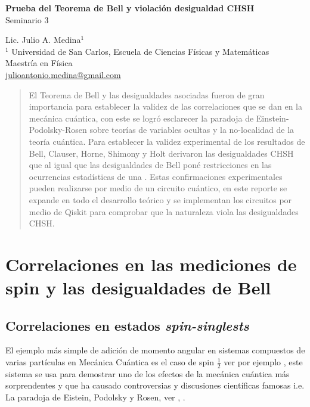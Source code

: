 \documentclass[a4paper]{article}
\begin{document}

\Large
 \begin{center}
\textbf{Prueba del Teorema de Bell y violación desigualdad CHSH}\\
Seminario 3  

\hspace{10pt}

\large
Lic. Julio A. Medina$^1$ \\

\hspace{10pt}
\small  
$^1$ Universidad de San Carlos, Escuela de Ciencias Físicas y Matemáticas\\
Maestría en Física\\
\href{mailto:julioantonio.medina@gmail.com}{julioantonio.medina@gmail.com}\\

\end{center}

\hspace{10pt}


\normalsize

\begin{abstract}
El Teorema de Bell y las desigualdades asociadas fueron de gran importancia para establecer la validez de las correlaciones que se dan en la mecánica cuántica, con este se logró esclarecer la paradoja de Einstein-Podolsky-Rosen sobre teorías de variables ocultas y la no-localidad de la teoría cuántica. Para establecer la validez experimental de los resultados de Bell, Clauser, Horne, Shimony y Holt derivaron las desigualdades CHSH que al igual que las desigualdades de Bell poné restricciones en las ocurrencias estadísticas de una . Estas confirmaciones experimentales pueden realizarse por medio de un circuito cuántico, en este reporte se expande en todo el desarrollo teórico y se implementan los circuitos por medio de Qiskit para comprobar que la naturaleza viola las desigualdades CHSH.
\end{abstract}

\section{Correlaciones en las mediciones de spin y las desigualdades de Bell}
\subsection{Correlaciones en estados \textit{spin-singlests}}
El ejemplo más simple de adición de momento angular en sistemas compuestos de varias partículas en Mecánica Cuántica es el caso de spin $\frac{1}{2}$ ver por ejemplo \cite{Sakurai}, este sistema se usa para demostrar uno de los efectos de la mecánica cuántica más sorprendentes y que ha causado controversias y discusiones científicas famosas i.e. La paradoja de Eistein, Podolsky y Rosen, ver \cite{Einstein}, \cite{Bell}.\\
\end{document}
